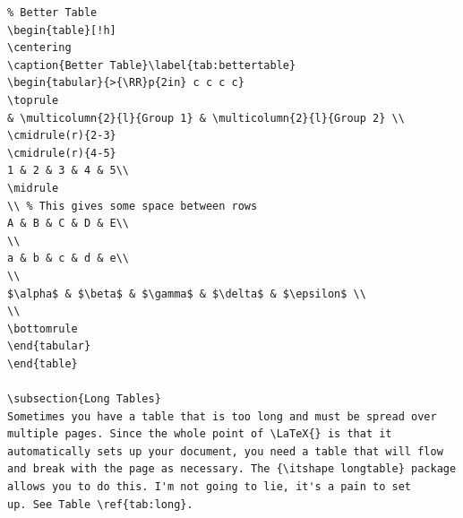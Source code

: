 \documentclass[12pt]{article}
\newcommand{\RR}{\raggedright\arraybackslash} %
\begin{document}
\begin{verbatim}
% Better Table
\begin{table}[!h]
\centering
\caption{Better Table}\label{tab:bettertable}
\begin{tabular}{>{\RR}p{2in} c c c c}
\toprule
& \multicolumn{2}{l}{Group 1} & \multicolumn{2}{l}{Group 2} \\
\cmidrule(r){2-3}
\cmidrule(r){4-5}
1 & 2 & 3 & 4 & 5\\
\midrule
\\ % This gives some space between rows
A & B & C & D & E\\
\\
a & b & c & d & e\\
\\
$\alpha$ & $\beta$ & $\gamma$ & $\delta$ & $\epsilon$ \\
\\
\bottomrule
\end{tabular}
\end{table}

\subsection{Long Tables}
Sometimes you have a table that is too long and must be spread over
multiple pages. Since the whole point of \LaTeX{} is that it
automatically sets up your document, you need a table that will flow
and break with the page as necessary. The {\itshape longtable} package
allows you to do this. I'm not going to lie, it's a pain to set
up. See Table \ref{tab:long}.


\end{verbatim}
\end{document}
